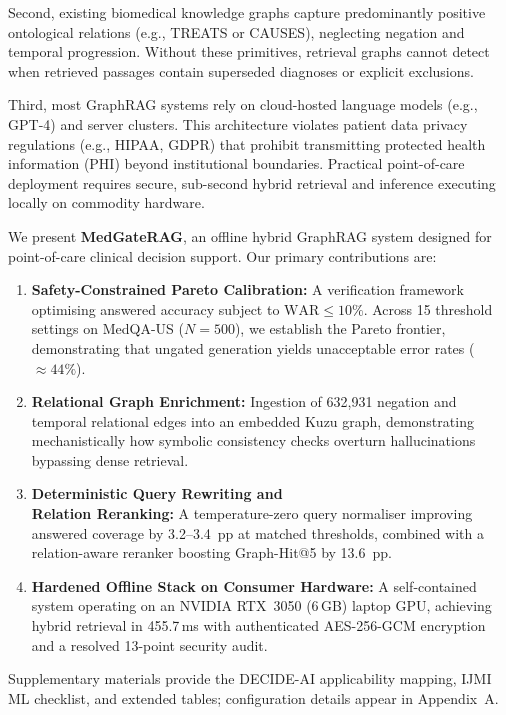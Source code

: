 \documentclass[preprint,12pt,a4paper]{elsarticle}
\begin{document}
Second, existing biomedical knowledge graphs capture predominantly positive ontological
relations (e.g., \textsc{TREATS} or \textsc{CAUSES}), neglecting negation and
temporal progression. Without these primitives, retrieval graphs cannot detect when
retrieved passages contain superseded diagnoses or explicit exclusions.

Third, most GraphRAG systems rely on cloud-hosted language models (e.g., GPT-4) and
server clusters. This architecture violates patient data privacy regulations (e.g.,
HIPAA, GDPR) that prohibit transmitting protected health information (PHI) beyond
institutional boundaries. Practical point-of-care deployment requires secure,
sub-second hybrid retrieval and inference executing locally on commodity hardware.

We present \textbf{MedGateRAG}, an offline hybrid
GraphRAG system designed for point-of-care clinical decision support. Our primary
contributions are:
\begin{enumerate}
  \item \textbf{Safety-Constrained Pareto Calibration:} A verification framework
        optimising answered accuracy subject to $\text{WAR} \leq 10\%$. Across 15
        threshold settings on MedQA-US ($N=500$), we establish the Pareto frontier,
        demonstrating that ungated generation yields unacceptable error rates ($\approx 44\%$).
  \item \textbf{Relational Graph Enrichment:} Ingestion of 632,931 negation and
        temporal relational edges into an embedded Kuzu graph, demonstrating
        mechanistically how symbolic consistency checks overturn hallucinations
        bypassing dense retrieval.
  \item \textbf{Deterministic Query Rewriting and}\\
        \textbf{Relation Reranking:} A
        temperature-zero query normaliser improving answered coverage by 3.2--3.4~pp
        at matched thresholds, combined with a relation-aware reranker boosting
        Graph-Hit@5 by 13.6~pp.
  \item \textbf{Hardened Offline Stack on Consumer Hardware:} A self-contained
        system operating on an NVIDIA RTX~3050 (6\,GB) laptop GPU, achieving
        hybrid retrieval in 455.7\,ms with authenticated AES-256-GCM encryption
        and a resolved 13-point security audit.
\end{enumerate}

Supplementary materials provide the DECIDE-AI applicability mapping, IJMI ML
checklist, and extended tables; configuration details appear in Appendix~A.
\end{document}
